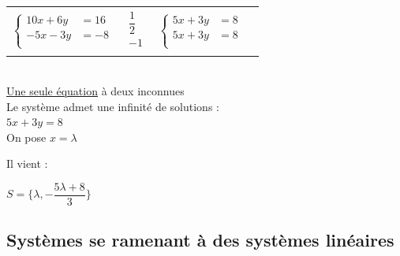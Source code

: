 \begin{tabular}{lp{3cm}ll}
\begin{minipage}{3cm}
$\begin{cases}
   10x +6y   \!\!\!\!\!\!\!\!&= 16\\
   -5x -3y  \!\!\!\!\!\!\!\!&=  -8\\
\end{cases}$ 
\end{minipage}  &  \multicolumn{1}{|l}{$\begin{array}{l}
                     \dfrac{1}{2}\\ -1 \\ 
                  \end{array}$ } & 
                   \begin{minipage}{3cm}
                   $\begin{cases}
                         5x +3y  \!\!\!\!\!\!\!\! &= 8\\
                         5x +3y  \!\!\!\!\!\!\!\! &= 8 \\
                   \end{cases} $ 
                \end{minipage} &  \\

\end{tabular}\\

\underline{Une seule équation} à deux inconnues\\
 Le système admet une infinité de solutions : \\

$5x +3y =8$\\
On pose $x=\lambda$ \\


\begin{minipage}{5cm}
Il vient :  
\end{minipage}  

$S=\lbrace\lambda ,-\dfrac{5\lambda +8 }{3}\rbrace$  

\samepage

\newpage

\subsection{Systèmes se ramenant à des systèmes linéaires}

